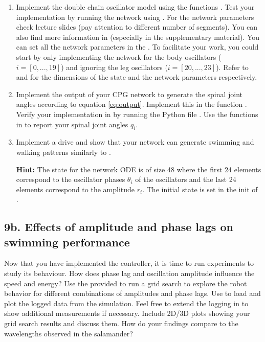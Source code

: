 \documentclass{cmc}
\begin{document}
\begin{enumerate}
\item Implement the double chain oscillator model using the functions
  . Test your implementation by running the
  network using . For the network parameters check
  lecture slides (pay attention to different number of segments). You can also
  find more information in \cite{ijspeert2007swimming} (especially in the
  supplementary material). You can set all the network parameters in the
  . To facilitate your work, you
  could start by only implementing the network for the body oscillators
  ($i=[0, ..., 19]$) and ignoring the leg oscillators ($i=[20, ..., 23]$). Refer
  to  and
  \- for the dimensions of
  the state and the network parameters respectively.

\item Implement the output of your CPG network to generate the spinal joint
  angles according to equation \ref{eq:output}. Implement this in the function
  . Verify your implementation in by running
  the Python file .  Use the functions in
   to report your spinal joint angles $q_i$.

\item Implement a drive and show that your network can generate swimming and
  walking patterns similarly to \cite{ijspeert2007swimming}.


  \textbf{Hint:} The state for the network ODE is of size 48 where the first 24
  elements correspond to the oscillator phases $\theta_i$ of the oscillators and
  the last 24 elements correspond to the amplitude $r_i$. The initial state is
  set in the init of .
\end{enumerate}


\subsection*{9b. Effects of amplitude and phase lags on swimming
  performance}
\label{sec:amplitude-phase-performance}

Now that you have implemented the controller, it is time to run experiments to
study its behaviour. How does phase lag and oscillation amplitude influence the
speed and energy? Use the provided 
to run a grid search to explore the robot behavior for different combinations of
amplitudes and phase lags. Use  to load and plot the
logged data from the simulation. Feel free to extend the logging in
 to show additional measurements if necessary. Include 2D/3D
plots showing your grid search results and discuss them. How do your findings
compare to the wavelengths observed in the salamander?
\end{document}
